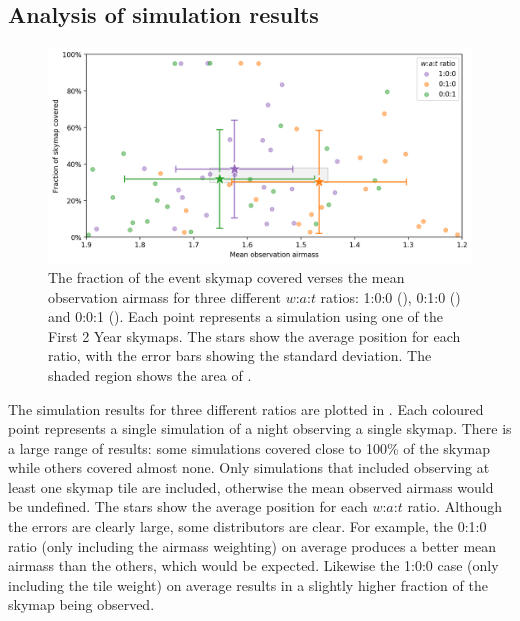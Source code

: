 
\subsection{Analysis of simulation results}
\label{sec:scheduler_sim_analysis}
\begin{colsection}

\begin{figure}[t]
    \begin{center}
        \includegraphics[width=\linewidth]{images/sched_sim1.png}
    \end{center}
    \caption[Skymap coverage verses mean airmass for different $w$:$a$:$t$ ratios]{
        The fraction of the event skymap covered verses the mean observation airmass for three different $w$:$a$:$t$ ratios: 1:0:0 (), 0:1:0 () and 0:0:1 (). Each point represents a simulation using one of the First 2 Year skymaps. The stars show the average position for each ratio, with the error bars showing the standard deviation. The shaded region shows the area of .
    }\label{fig:scheduler_sim_results1}
\end{figure}

The simulation results for three different ratios are plotted in . Each coloured point represents a single simulation of a night observing a single skymap. There is a large range of results: some simulations covered close to 100\% of the skymap while others covered almost none. Only simulations that included observing at least one skymap tile are included, otherwise the mean observed airmass would be undefined. The stars show the average position for each $w$:$a$:$t$ ratio. Although the errors are clearly large, some distributors are clear. For example, the 0:1:0 ratio (only including the airmass weighting) on average produces a better mean airmass than the others, which would be expected. Likewise the 1:0:0 case (only including the tile weight) on average results in a slightly higher fraction of the skymap being observed.


\end{colsection}

